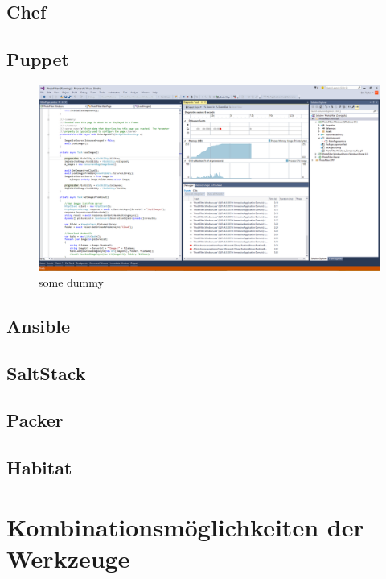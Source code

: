 
\label{lst:vagrant-bootstrap}

\label{lst:vagrantfile}

\subsection{Chef}
\label{sub:chef}

\subsection{Puppet}
\label{sub:puppet}

\begin{figure}[htbp]
    \centering
    \includegraphics[width=0.9\linewidth]{images/dummy}
    \caption{some dummy}
\label{fig:dummy}
\end{figure}

\subsection{Ansible}
\label{sub:ansible}

\subsection{SaltStack}
\label{sub:saltstack}

\subsection{Packer}
\label{sub:packer}

\subsection{Habitat}
\label{sub:habitat}


\section{Kombinationsmöglichkeiten der Werkzeuge}
\label{sec:werkzeugkombinationsmoeglichkeiten}
